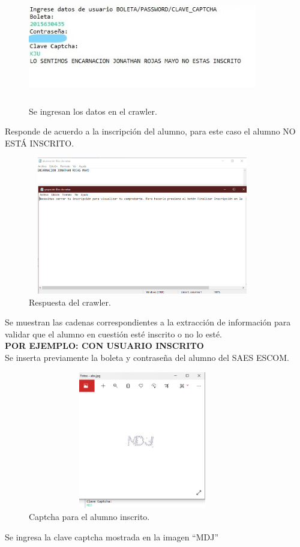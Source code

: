 	\begin{figure}[hbt!]
		\centering
		\includegraphics[width=10cm, height=5cm]{Imagenes/Crawler/Datosloginnoinscrito}
		\caption{Se ingresan los datos en el crawler.}
		\label{datosloginnoinscrito}
	\end{figure}
	\noindent Responde de acuerdo a la inscripción del alumno, para este caso el alumno NO ESTÁ INSCRITO.
\pagebreak

	\begin{figure}[hbt!]
		\centering
		\includegraphics[width=10cm, height=6cm]{Imagenes/Crawler/Noinscrito}
		\caption{Respuesta del crawler.}
		\label{noinscrito}
	\end{figure}

	\noindent Se muestran las cadenas correspondientes a la extracción de información para validar que el alumno en cuestión esté inscrito o no lo esté.\\
	
	\textbf{POR EJEMPLO: CON USUARIO INSCRITO}\\
	\noindent Se inserta previamente la boleta y contraseña del alumno del SAES ESCOM.
	
	\begin{figure}[hbt!]
		\centering
		\includegraphics[width=10cm, height=6cm]{Imagenes/Crawler/Imagenlogininscrito}
		\caption{Captcha para el alumno inscrito.}
		\label{imagenlogininscrito}
	\end{figure}
	\noindent Se ingresa la clave captcha mostrada en la imagen “MDJ”
\pagebreak
	
